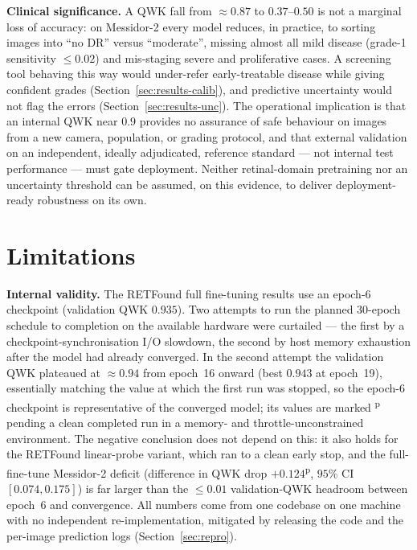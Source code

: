 \documentclass[journal]{IEEEtran}
\newcommand{\pv}[1]{#1\textsuperscript{p}}
\begin{document}
\textbf{Clinical significance.} A QWK fall from $\approx 0.87$ to $0.37$--$0.50$
is not a marginal loss of accuracy: on Messidor-2 every model reduces, in
practice, to sorting images into ``no DR'' versus ``moderate'', missing almost
all mild disease (grade-1 sensitivity $\leq 0.02$) and mis-staging severe and
proliferative cases. A screening tool behaving this way would under-refer
early-treatable disease while giving confident grades
(Section~\ref{sec:results-calib}), and predictive uncertainty would not flag the
errors (Section~\ref{sec:results-unc}). The operational implication is that an
internal QWK near $0.9$ provides no assurance of safe behaviour on images from a
new camera, population, or grading protocol, and that external validation on an
independent, ideally adjudicated, reference standard --- not internal test
performance --- must gate deployment. Neither retinal-domain pretraining nor an
uncertainty threshold can be assumed, on this evidence, to deliver
deployment-ready robustness on its own.


\section{Limitations}
\label{sec:limitations}

\textbf{Internal validity.} The RETFound full fine-tuning results use an epoch-6
checkpoint (validation QWK $0.935$). Two attempts to run the planned $30$-epoch
schedule to completion on the available hardware were curtailed --- the first by a
checkpoint-synchronisation I/O slowdown, the second by host memory exhaustion
after the model had already converged. In the second attempt the validation QWK
plateaued at $\approx 0.94$ from epoch~16 onward (best $0.943$ at epoch~19),
essentially matching the value at which the first run was stopped, so the epoch-6
checkpoint is representative of the converged model; its values are marked
\textsuperscript{p} pending a clean completed run in a memory- and
throttle-unconstrained environment. The negative conclusion does not depend on
this: it also holds for the RETFound linear-probe variant, which ran to a clean
early stop, and the full-fine-tune Messidor-2 deficit (difference in QWK drop
\pv{$+0.124$}, $95\%$ CI $[0.074,0.175]$) is far larger than the $\leq 0.01$
validation-QWK headroom between epoch~6 and convergence. All numbers come from one
codebase on one machine with no independent re-implementation, mitigated by
releasing the code and the per-image prediction logs (Section~\ref{sec:repro}).
\end{document}
